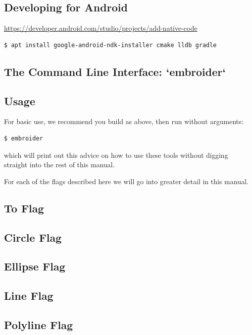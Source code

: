 \documentclass[11pt]{report}
\begin{document}
\subsection{Developing for Android}

\url{https://developer.android.com/studio/projects/add-native-code}

\begin{lstlisting}
$ apt install google-android-ndk-installer cmake lldb gradle
\end{lstlisting}

\subsection{The Command Line Interface: `embroider`}

\subsection{Usage}

For basic use, we recommend you build as above, then run without arguments:

\begin{lstlisting}
$ embroider
\end{lstlisting}

which will print out this advice on how to use these tools without digging straight into the rest of this manual.


For each of the flags described here we will go into greater detail in this manual.

\subsection{To Flag}

\subsection{Circle Flag}

\subsection{Ellipse Flag}

\subsection{Line Flag}

\subsection{Polyline Flag}
\end{document}
